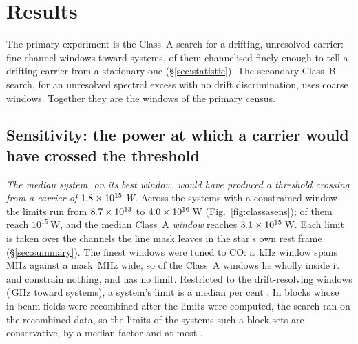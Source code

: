 \section{Results}
\label{sec:results}

The primary experiment is the Class~A search for a drifting, unresolved
carrier: \NWinA{} fine-channel windows toward \NSysClassA{} systems,
\EdrNWinA{} of them channelised finely enough to tell a drifting carrier from
a stationary one (\S\ref{sec:statistic}). The secondary Class~B search, for an
unresolved spectral excess with no drift discrimination, uses \NWinB{} coarse
windows. Together they are the \NWindows{} windows of the primary census.

\subsection{Sensitivity: the power at which a carrier would have crossed
the threshold} \label{sec:pninetysel}

\emph{The median system, on its best window, would have produced a threshold
crossing from a carrier of $1.8\times10^{15}$\,W.} Across the \NSysALim{}
systems with a constrained window the limits run from $8.7\times10^{13}$ to
$4.0\times10^{16}$\,W (Fig.~\ref{fig:classasens}); \NSysEfifteen{} of them
reach $10^{15}$\,W, and the median Class~A \emph{window} reaches
$3.1\times10^{15}$\,W. Each limit is taken over the channels the line mask
leaves in the star's own rest frame (\S\ref{sec:summary}). The finest windows
were tuned to CO: a \UmFineChanKHz\,kHz window spans \UmFineBwMHz\,MHz against
a mask \UmFineMaskMHz\,MHz wide, so \UmNWinAFull{} of the \NWinA{} Class~A
windows lie wholly inside it and constrain nothing, and \NSysALostName{} has no
limit. Restricted to the \EdrNWinA{} drift-resolving windows
(\EdrUnionGHz\,GHz toward \EdrNSys{} systems), a system's limit is a median
\ScEdrMedPct{} per cent \ScEdrMedSense. In
\FcNBlock{} blocks whose in-beam fields were recombined after the limits were
computed, the search ran on the recombined data, so the limits of the
\FcNSys{} systems such a block sets are conservative, by a median factor
\FcMedFactor{} and at most \FcMaxFactor.

